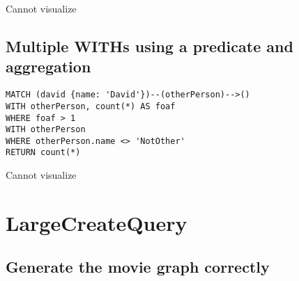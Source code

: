 Cannot visualize
\subsection{Multiple WITHs using a predicate and aggregation}

\begin{lstlisting}
MATCH (david {name: 'David'})--(otherPerson)-->()
WITH otherPerson, count(*) AS foaf
WHERE foaf > 1
WITH otherPerson
WHERE otherPerson.name <> 'NotOther'
RETURN count(*)
\end{lstlisting}

Cannot visualize
\section{LargeCreateQuery}

\subsection{Generate the movie graph correctly}

